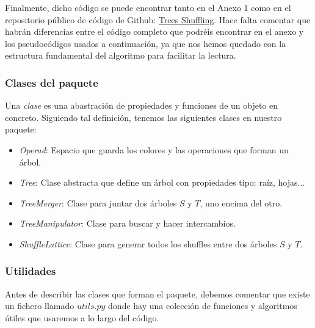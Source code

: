 \documentclass[../main.tex]{subfiles}
\begin{document}
Finalmente, dicho c\'odigo se puede encontrar tanto en el Anexo 1 como en el repositorio p\'ublico de c\'odigo de Github: \href{https://github.com/rbrasco/trees-shuffling}{Trees Shuffling}.
Hace falta comentar que habr\'an diferencias entre el c\'odigo completo que podr\'eis encontrar en el anexo y los pseudoc\'odigos usados a continuaci\'on, ya que nos hemos quedado con la estructura fundamental del algoritmo para facilitar la lectura.

\subsubsection*{Clases del paquete}
\begin{defi}
    Una \emph{clase} es una abastraci\'on de propiedades y funciones de un objeto en concreto.
    Siguiendo tal definici\'on, tenemos las siguientes clases en nuestro paquete:
    \begin{itemize}
        \item \emph{Operad}: Espacio que guarda los colores y las operaciones que forman un \'arbol.
        \item \emph{Tree}: Clase abstracta que define un \'arbol con propiedades tipo: ra\'iz, hojas$\dots$
        \item \emph{TreeMerger}: Clase para juntar dos \'arboles $S$ y $T$, uno encima del otro.
        \item \emph{TreeManipulator}: Clase para buscar y hacer intercambios.
        \item \emph{ShuffleLattice}: Clase para generar todos los shuffles entre dos \'arboles $S$ y $T$.
    \end{itemize}
\end{defi}

\subsubsection*{Utilidades}
Antes de describir las clases que forman el paquete, debemos comentar que existe un fichero llamado $utils.py$ donde hay una colecci\'on de funciones y algoritmos \'utiles que usaremos a lo largo del c\'odigo.
\end{document}
